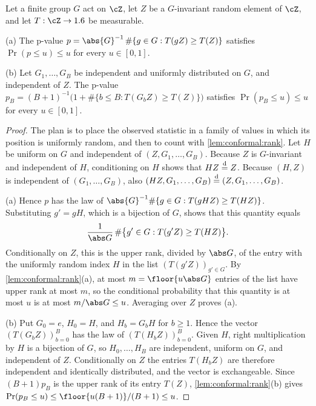 \begin{refsection}
\begin{theorem}\label{thm:conformal:randomization}
Let a finite group $G$ act on $\cZ$, let $Z$ be a $G$-invariant random element of $\cZ$, and let $T:\cZ\to\R$ be measurable.
\par\textup{(a)} The p-value $p=\abs{G}^{-1}\,\#\{g\in G : T(gZ)\ge T(Z)\}$ satisfies $\Pr(p\le u)\le u$ for every $u\in[0,1]$.
\par\textup{(b)} Let $G_1,\dots,G_B$ be independent and uniformly distributed on $G$, and independent of $Z$. The p-value $p_B=(B+1)^{-1}\bigl(1+\#\{b\le B : T(G_bZ)\ge T(Z)\}\bigr)$ satisfies $\Pr(p_B\le u)\le u$ for every $u\in[0,1]$.
\end{theorem}

\begin{proof}
The plan is to place the observed statistic in a family of values in which its position is uniformly random, and then to count with \cref{lem:conformal:rank}. Let $H$ be uniform on $G$ and independent of $(Z,G_1,\dots,G_B)$. Because $Z$ is $G$-invariant and independent of $H$, conditioning on $H$ shows that $HZ\overset{\mathrm{d}}{=} Z$. Because $(H,Z)$ is independent of $(G_1,\dots,G_B)$, also $(HZ,G_1,\dots,G_B)\overset{\mathrm{d}}{=}(Z,G_1,\dots,G_B)$.

(a) Hence $p$ has the law of $\abs{G}^{-1}\#\{g\in G : T(gHZ)\ge T(HZ)\}$. Substituting $g'=gH$, which is a bijection of $G$, shows that this quantity equals
\[
\frac{1}{\abs G}\,\#\bigl\{g'\in G : T(g'Z)\ge T(HZ)\bigr\}.
\]
Conditionally on $Z$, this is the upper rank, divided by $\abs G$, of the entry with the uniformly random index $H$ in the list $(T(g'Z))_{g'\in G}$. By \cref{lem:conformal:rank}(a), at most $m=\floor{u\abs G}$ entries of the list have upper rank at most $m$, so the conditional probability that this quantity is at most $u$ is at most $m/\abs G\le u$. Averaging over $Z$ proves (a).

(b) Put $G_0=e$, $H_0=H$, and $H_b=G_bH$ for $b\ge1$. Hence the vector $(T(G_bZ))_{b=0}^{B}$ has the law of $(T(H_bZ))_{b=0}^{B}$. Given $H$, right multiplication by $H$ is a bijection of $G$, so $H_0,\dots,H_B$ are independent, uniform on $G$, and independent of $Z$. Conditionally on $Z$ the entries $T(H_bZ)$ are therefore independent and identically distributed, and the vector is exchangeable. Since $(B+1)p_B$ is the upper rank of its entry $T(Z)$, \cref{lem:conformal:rank}(b) gives $\Pr(p_B\le u)\le\floor{u(B+1)}/(B+1)\le u$.
\end{proof}


\end{refsection}
